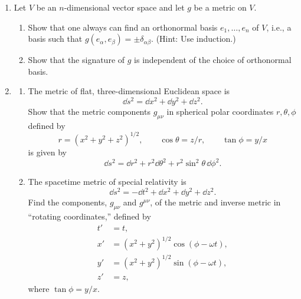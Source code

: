 \begin{enumerate}[label=\arabic*., leftmargin=*]
\begin{enumerate}[label=\alph*)]
    \item Prove that the operation of contraction, Eq.~\eqref{eq:2.3.2}, is
      independent of the choice of basis.
  \end{enumerate}

  \item Let \(V\) be an \(n\)-dimensional vector space and let \(g\) be a metric
  on \(V\).
  \begin{enumerate}[label=\alph*)]
    \item Show that one always can find an orthonormal basis \(e_1,\ldots,e_n\) of
      \(V\), i.e., a basis such that \(g(e_\alpha,e_\beta)=\pm\delta_{\alpha\beta}\).
      (Hint: Use induction.)

    \item Show that the signature of \(g\) is independent of the choice of
      orthonormal basis.
  \end{enumerate}

  \item
  \begin{enumerate}[label=\alph*)]
    \item The metric of flat, three-dimensional Euclidean space is
      \[
        \dd s^2=\dd x^2+\dd y^2+\dd z^2 .
      \]
      Show that the metric components \(g_{\mu\nu}\) in spherical polar
      coordinates \(r,\theta,\phi\) defined by
      \[
        r=(x^2+y^2+z^2)^{1/2},
        \qquad \cos\theta=z/r,
        \qquad \tan\phi=y/x
      \]
      is given by
      \[
        \dd s^2=\dd r^2+r^2\dd\theta^2+r^2\sin^2\theta\,\dd\phi^2 .
      \]

    \item The spacetime metric of special relativity is
      \[
        \dd s^2=-\dd t^2+\dd x^2+\dd y^2+\dd z^2 .
      \]
      Find the components, \(g_{\mu\nu}\) and \(g^{\mu\nu}\), of the metric and
      inverse metric in ``rotating coordinates,'' defined by
      \[
        \begin{aligned}
          t'&=t,\\
          x'&=(x^2+y^2)^{1/2}\cos(\phi-\omega t),\\
          y'&=(x^2+y^2)^{1/2}\sin(\phi-\omega t),\\
          z'&=z,
        \end{aligned}
      \]
      where \(\tan\phi=y/x\).
  \end{enumerate}
\end{enumerate}
